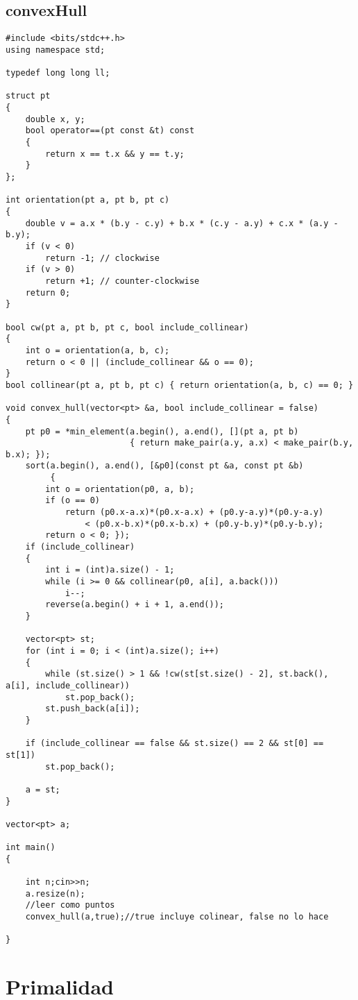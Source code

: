 \subsection*{convexHull}
\begin{lstlisting}
#include <bits/stdc++.h>
using namespace std;

typedef long long ll;

struct pt
{
	double x, y;
	bool operator==(pt const &t) const
	{
		return x == t.x && y == t.y;
	}
};

int orientation(pt a, pt b, pt c)
{
	double v = a.x * (b.y - c.y) + b.x * (c.y - a.y) + c.x * (a.y - b.y);
	if (v < 0)
		return -1; // clockwise
	if (v > 0)
		return +1; // counter-clockwise
	return 0;
}

bool cw(pt a, pt b, pt c, bool include_collinear)
{
	int o = orientation(a, b, c);
	return o < 0 || (include_collinear && o == 0);
}
bool collinear(pt a, pt b, pt c) { return orientation(a, b, c) == 0; }

void convex_hull(vector<pt> &a, bool include_collinear = false)
{
	pt p0 = *min_element(a.begin(), a.end(), [](pt a, pt b)
						 { return make_pair(a.y, a.x) < make_pair(b.y, b.x); });
	sort(a.begin(), a.end(), [&p0](const pt &a, const pt &b)
		 {
        int o = orientation(p0, a, b);
        if (o == 0)
            return (p0.x-a.x)*(p0.x-a.x) + (p0.y-a.y)*(p0.y-a.y)
                < (p0.x-b.x)*(p0.x-b.x) + (p0.y-b.y)*(p0.y-b.y);
        return o < 0; });
	if (include_collinear)
	{
		int i = (int)a.size() - 1;
		while (i >= 0 && collinear(p0, a[i], a.back()))
			i--;
		reverse(a.begin() + i + 1, a.end());
	}

	vector<pt> st;
	for (int i = 0; i < (int)a.size(); i++)
	{
		while (st.size() > 1 && !cw(st[st.size() - 2], st.back(), a[i], include_collinear))
			st.pop_back();
		st.push_back(a[i]);
	}

	if (include_collinear == false && st.size() == 2 && st[0] == st[1])
		st.pop_back();

	a = st;
}

vector<pt> a;

int main()
{
	
	int n;cin>>n;
	a.resize(n);
	//leer como puntos
	convex_hull(a,true);//true incluye colinear, false no lo hace

}\end{lstlisting}

\section*{Primalidad}

